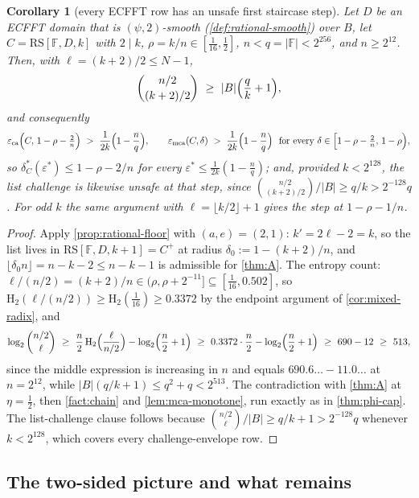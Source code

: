 \documentclass[11pt]{article}
\newtheorem{corollary}[corollary]{Corollary}
\theoremstyle{definition}
\theoremstyle{remark}
\newcommand{\F}{\mathbb{F}}
\newcommand{\B}{B}
\newcommand{\RS}{\mathrm{RS}}
\newcommand{\eca}{\varepsilon_{\mathrm{ca}}}
\newcommand{\emca}{\varepsilon_{\mathrm{mca}}}
\newcommand{\Hb}{\mathrm{H}_2}
\begin{document}
\begin{corollary}[every ECFFT row has an unsafe first staircase step]\label{cor:ecfft-onestep}
Let $D$ be an ECFFT domain that is $(\psi,2)$-smooth \textup(\cref{def:rational-smooth}\textup) over $\B$, let $C=\RS[\F,D,k]$ with $2\mid k$, $\rho=k/n\in[\tfrac1{16},\tfrac12]$, $n<q=|\F|<2^{256}$, and $n\ge2^{12}$. Then, with $\ell=(k+2)/2\le N-1$,
\[
\binom{n/2}{(k+2)/2}\ \ge\ |\B|\Bigl(\frac qk+1\Bigr),
\]
and consequently
\[
\eca\Bigl(C,\,1-\rho-\tfrac2n\Bigr)\ >\ \frac1{2k}\Bigl(1-\frac nq\Bigr),
\qquad
\emca(C,\delta)\ >\ \frac1{2k}\Bigl(1-\frac nq\Bigr)\ \ \text{for every }\delta\in\Bigl[1-\rho-\tfrac2n,\,1-\rho\Bigr),
\]
so $\delta^*_C(\varepsilon^*)\le1-\rho-2/n$ for every $\varepsilon^*\le\frac1{2k}(1-\frac nq)$; and, provided $k<2^{128}$, the list challenge is likewise unsafe at that step, since $\binom{n/2}{(k+2)/2}/|\B|\ge q/k>2^{-128}q$. For odd $k$ the same argument with $\ell=\lfloor k/2\rfloor+1$ gives the step at $1-\rho-1/n$.
\end{corollary}

\begin{proof}
Apply \cref{prop:rational-floor} with $(a,e)=(2,1)$: $k'=2\ell-2=k$, so the list lives in $\RS[\F,D,k+1]=C^+$ at radius $\delta_0:=1-(k+2)/n$, and $\lfloor\delta_0n\rfloor=n-k-2\le n-k-1$ is admissible for \cref{thm:A}. The entropy count: $\ell/(n/2)=(k+2)/n\in(\rho,\rho+2^{-11}]\subseteq[\tfrac1{16},0.502]$, so $\Hb(\ell/(n/2))\ge\Hb(\tfrac1{16})\ge0.3372$ by the endpoint argument of \cref{cor:mixed-radix}, and
\[
\log_2\binom{n/2}{\ell}\ \ge\ \frac n2\,\Hb\Bigl(\frac{\ell}{n/2}\Bigr)-\log_2\Bigl(\frac n2+1\Bigr)\ \ge\ 0.3372\cdot\frac n2-\log_2\Bigl(\frac n2+1\Bigr)\ \ge\ 690-12\ \ge\ 513,
\]
since the middle expression is increasing in $n$ and equals $690.6\ldots-11.0\ldots$ at $n=2^{12}$, while $|\B|(q/k+1)\le q^2+q<2^{513}$. The contradiction with \cref{thm:A} at $\eta=\frac12$, then \cref{fact:chain} and \cref{lem:mca-monotone}, run exactly as in \cref{thm:phi-cap}. The list-challenge clause follows because $\binom{n/2}{\ell}/|\B|\ge q/k+1>2^{-128}q$ whenever $k<2^{128}$, which covers every challenge-envelope row.
\end{proof}
\subsection{The two-sided picture and what remains}\label{sec:discharge-status}
\end{document}
